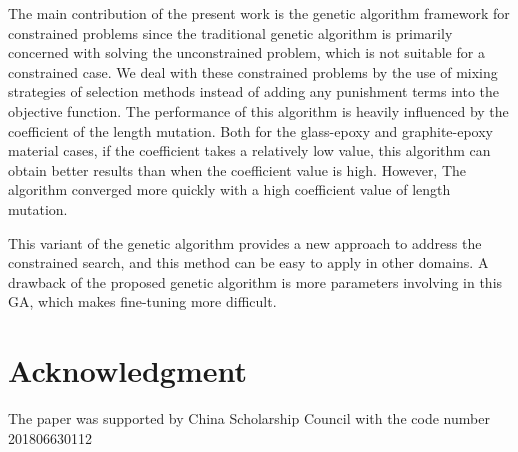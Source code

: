\documentclass[10pt, journal]{IEEEtran}
\begin{document}
The main contribution of the present work is the genetic algorithm framework for constrained problems since the traditional genetic algorithm is primarily concerned with solving the unconstrained problem, which is not suitable for a constrained case. We deal with these constrained problems by the use of mixing strategies of selection methods instead of adding any punishment terms into the objective
function. The performance of this algorithm is heavily influenced by
the coefficient of the length mutation. Both for the glass-epoxy and graphite-epoxy material cases, if the coefficient takes a relatively low value, this algorithm can obtain better results than when the coefficient value is high. However, The algorithm converged more quickly with a high coefficient value of length mutation. 

This variant of the genetic algorithm provides a new approach to address the constrained search, and this method can be easy to apply in other domains. A drawback of the proposed genetic algorithm is more parameters involving in this GA, which makes fine-tuning more difficult.

\section*{Acknowledgment}
The paper was supported by China Scholarship Council with
the code number 201806630112



\end{document}

